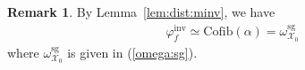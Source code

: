 \documentclass [11pt,oneside,a4paper,mathscr]{amsart}
\newtheorem{prop}[thm]{Proposition}
\theoremstyle{definition}
\newtheorem{remark}[thm]{Remark}
\renewcommand{\geq}{\geqslant}
\newcommand{\X}{\mathscr{X}}
\begin{document}
\begin{remark}\label{rmk:cofib}
By Lemma~\ref{lem:dist:minv}, we have 
\begin{align*}
    \varphi_f^{\mathrm{inv}} \simeq \mathrm{Cofib}(\alpha)=\omega_{\X_0}^{\mathrm{sg}}
\end{align*}
where $\omega_{\X_0}^{\mathrm{sg}}$ is given in (\ref{omega:sg}). 
    
\end{remark}

















\end{document}

